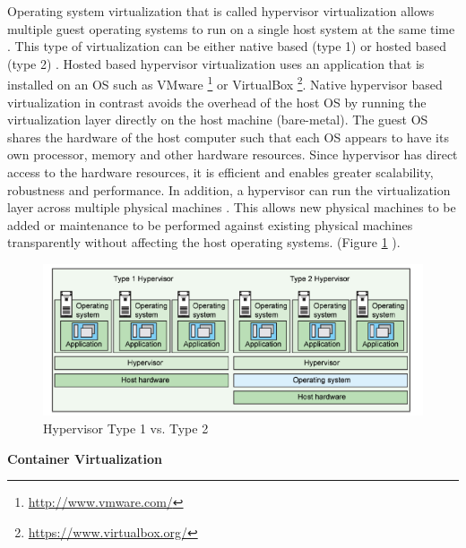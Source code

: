 \documentclass[a4paper,11pt,twoside]{article}
\begin{document}
\noindent
Operating system virtualization that is called hypervisor virtualization allows multiple guest operating systems to run on a single host system at the same time \cite{Hypervisors2}. This type of virtualization can be either native based (type 1) or hosted based (type 2) \cite{Hypervisors}. Hosted based hypervisor virtualization uses an application that is installed on an OS such as VMware \footnote{\url{http://www.vmware.com/}} or VirtualBox \footnote{\url {https://www.virtualbox.org/}}. Native hypervisor based virtualization in contrast avoids the overhead of the host OS by running the virtualization layer directly on the host machine (bare-metal). The guest OS shares the hardware of the host computer such that each OS appears to have its own processor, memory and other hardware resources. Since hypervisor has direct access to the hardware resources, it is efficient and enables greater scalability, robustness and performance. In addition, a hypervisor can run the virtualization layer across multiple physical machines \cite{Hypervisors}. This allows new physical machines to be added or maintenance to be performed against existing physical machines transparently without affecting the host operating systems. (Figure \ref{Hypervisor} ).\bigskip


\begin{figure}[!ht]
  \centering
     \includegraphics[scale=1]{Hypervisor}
  \caption{Hypervisor Type 1 vs. Type 2 \cite{Hypervisors}}
  \label{Hypervisor}
\end{figure}

\noindent
\textbf{Container Virtualization} 
\end{document}
